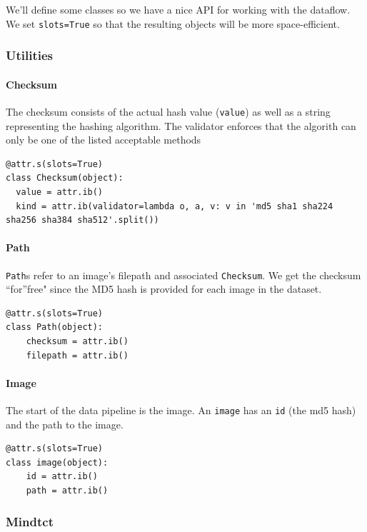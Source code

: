 We'll define some classes so we have a nice API for working with the
dataflow. We set \texttt{slots=True} so that the resulting objects will
be more space-efficient.

\subsubsection{Utilities}\label{utilities}

\paragraph{Checksum}\label{checksum}

The checksum consists of the actual hash value (\texttt{value}) as well
as a string representing the hashing algorithm. The validator enforces
that the algorith can only be one of the listed acceptable methods

\begin{verbatim}
@attr.s(slots=True)
class Checksum(object):
  value = attr.ib()
  kind = attr.ib(validator=lambda o, a, v: v in 'md5 sha1 sha224 sha256 sha384 sha512'.split())
\end{verbatim}

\paragraph{Path}\label{path}

\texttt{Path}s refer to an image's filepath and associated
\texttt{Checksum}. We get the checksum ``for''free" since the MD5 hash
is provided for each image in the dataset.

\begin{verbatim}
@attr.s(slots=True)
class Path(object):
    checksum = attr.ib()
    filepath = attr.ib()
\end{verbatim}

\paragraph{Image}\label{image}

The start of the data pipeline is the image. An \texttt{image} has an
\texttt{id} (the md5 hash) and the path to the image.

\begin{verbatim}
@attr.s(slots=True)
class image(object):
    id = attr.ib()
    path = attr.ib()
\end{verbatim}

\subsubsection{Mindtct}\label{mindtct}

